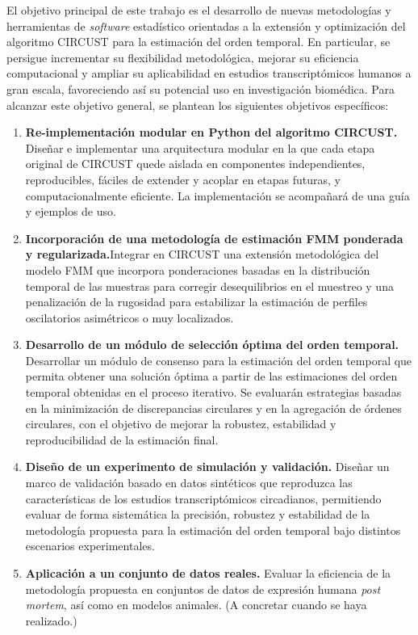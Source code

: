\documentclass[12pt, a4paper]{report}
\begin{document}
El objetivo principal de este trabajo es el desarrollo de nuevas metodologías y herramientas de \textit{software} estadístico orientadas a la extensión y optimización del algoritmo CIRCUST para la estimación del orden temporal. En particular, se persigue incrementar su flexibilidad metodológica, mejorar su eficiencia computacional y ampliar su aplicabilidad en estudios transcriptómicos humanos a gran escala, favoreciendo así su potencial uso en investigación biomédica. Para alcanzar este objetivo general, se plantean los siguientes objetivos específicos:
\begin{enumerate}
    \item \textbf{Re-implementación modular en Python del algoritmo CIRCUST.} Diseñar e implementar una arquitectura modular en la que cada etapa original de CIRCUST quede aislada en componentes independientes, reproducibles, fáciles de extender y acoplar en etapas futuras, y computacionalmente eficiente. La implementación se acompañará de una guía y ejemplos de uso.

    \item \textbf{Incorporación de una metodología de estimación FMM ponderada y regularizada.}Integrar en CIRCUST una extensión metodológica del modelo FMM que incorpora ponderaciones basadas en la distribución temporal de las muestras para corregir desequilibrios en el muestreo y una penalización de la rugosidad para estabilizar la estimación de perfiles oscilatorios asimétricos o muy localizados.

    \item \textbf{Desarrollo de un módulo de selección óptima del orden temporal.} Desarrollar un módulo de consenso para la estimación del orden temporal que permita obtener una solución óptima a partir de las  estimaciones del orden temporal obtenidas en el proceso iterativo. Se evaluarán estrategias basadas en la minimización de discrepancias circulares y en la agregación de órdenes circulares, con el objetivo de mejorar la robustez, estabilidad y reproducibilidad de la estimación final.

    \item \textbf{Diseño de un experimento de simulación y validación.} Diseñar un marco de validación basado en datos sintéticos que reproduzca las características de los estudios transcriptómicos circadianos, permitiendo evaluar de forma sistemática la precisión, robustez y estabilidad de la metodología propuesta para la estimación del orden temporal bajo distintos escenarios experimentales.

    \item \textbf{Aplicación a un conjunto de datos reales.} Evaluar la eficiencia de la metodología propuesta en conjuntos de datos de expresión humana \textit{post mortem}, así como en modelos animales. (A concretar cuando se haya realizado.)
\end{enumerate}
\end{document}

